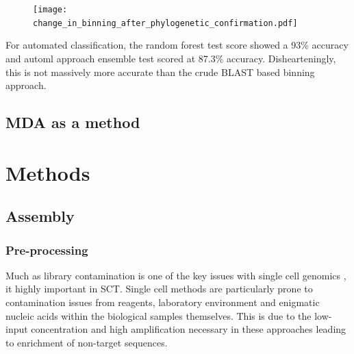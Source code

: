 \begin{figure}
    \texttt{[image: change\_in\_binning\_after\_phylogenetic\_confirmation.pdf]}
\end{figure}

For automated classification, the random forest test score showed a 93\% accuracy and automl approach ensemble test scored at 87.3\% accuracy.
Dishearteningly, this is not massively more accurate than the crude BLAST based binning approach.
     

\subsection{MDA as a method}




\section{Methods}





\subsection{Assembly}

\subsubsection{Pre-processing}
Much as library contamination is one of the key issues with single cell genomics \citep{Blainey2013,Lusk2014}, it highly
important in SCT.  Single cell methods are particularly prone to contamination issues
from reagents, laboratory environment and enigmatic nucleic acids within the biological samples themselves.
This is due to the low-input concentration and high amplification necessary in these approaches \citep{Blainey2013} 
leading to enrichment of non-target sequences.


